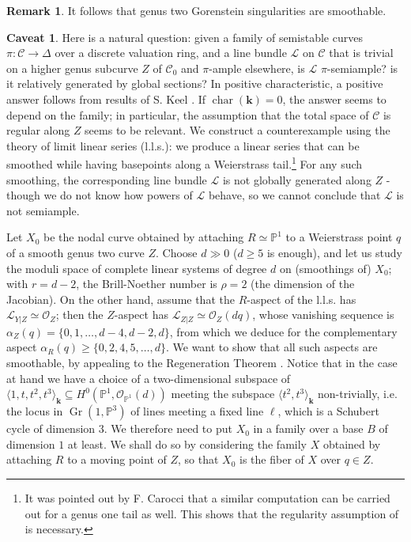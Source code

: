 \documentclass[11pt]{amsart}
\newcommand{\PP}{\mathbb P}
\renewcommand{\k}{\mathbf k}
\newcommand{\OO}{\mathcal O}
\renewcommand{\to}{\rightarrow}
\newcommand{\dvr}{\Delta}
\theoremstyle{plain}
\theoremstyle{definition}
\newtheorem*{caveat}{Caveat}
\newtheorem{rem}[thm]{Remark}
\begin{document}
\begin{rem}
 It follows that genus two Gorenstein singularities are smoothable.
\end{rem}

\begin{caveat} Here is a natural question: given a family of semistable curves $\pi\colon\mathcal C\to\dvr$ over a discrete valuation ring, and a line bundle $\mathcal L$ on $\mathcal C$ that is trivial on a higher genus subcurve $Z$ of $\mathcal C_0$ and $\pi$-ample elsewhere, is $\mathcal L$ $\pi$-semiample? is it relatively generated by global sections? In positive characteristic, a positive answer follows from results of S. Keel \cite{Keel-bpf}. If $\operatorname{char}(\k)=0$, the answer seems to depend on the family; in particular, the assumption that the total space of $\mathcal C$ is regular along $Z$ seems to be relevant. We construct a counterexample using the theory of limit linear series (l.l.s.): we produce a linear series that can be smoothed while having basepoints along a Weierstrass tail.\footnote{It was pointed out by F. Carocci that a similar computation can be carried out for a genus one tail as well. This shows that the regularity assumption of \cite[Lemma 2.13]{SMY1} is necessary.} For any such smoothing, the corresponding line bundle $\mathcal L$ is not globally generated along $Z$ - though we do not know how powers of $\mathcal L$ behave, so we cannot conclude that $\mathcal L$ is not semiample.
 
 Let $X_0$ be the nodal curve obtained by attaching $R\simeq\PP^1$ to a Weierstrass point $q$ of a smooth genus two curve $Z$. Choose $d\gg 0$ ($d\geq5$ is enough), and let us study the moduli space of complete linear systems of degree $d$ on (smoothings of) $X_0$; with $r=d-2$, the Brill-Noether number is $\rho=2$ (the dimension of the Jacobian). On the other hand, assume that the $R$-aspect of the l.l.s. has $\mathcal L_{Y|Z}\simeq\OO_Z$; then the $Z$-aspect has $\mathcal L_{Z|Z}\simeq\OO_Z(dq)$, whose vanishing sequence is $\alpha_Z(q)=\{0,1,\ldots,d-4,d-2,d\}$, from which we deduce for the complementary aspect $\alpha_R(q)\geq\{0,2,4,5,\ldots,d\}$. We want to show that all such aspects are smoothable, by appealing to the Regeneration Theorem \cite[Theorem 5.41]{HM}. Notice that in the case at hand we have a choice of a two-dimensional subspace of $\langle 1,t,t^2,t^3\rangle_\k\subseteq H^0(\PP^1,\OO_{\PP^1}(d))$ meeting the subspace $\langle t^2,t^3\rangle_\k$ non-trivially, i.e. the locus in $\operatorname{Gr}(1,\PP^3)$ of lines meeting a fixed line $\ell$, which is a Schubert cycle of dimension $3$. We therefore need to put $X_0$ in a family over a base $B$ of dimension $1$ at least.  We shall do so by considering the family $X$ obtained by attaching $R$ to a moving point of $Z$, so that $X_0$ is the fiber of $X$ over $q\in Z$.
 

\end{caveat}
\end{document}
